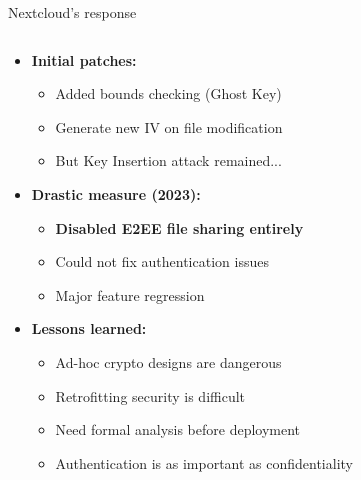\documentclass[aspectratio=169, lualatex, handout]{beamer}
\begin{document}
\begin{frame}{Nextcloud's response}
	\begin{columns}[c]
		\begin{column}{1\textwidth}
			\begin{itemize}
				\item \textbf{Initial patches:}
				      \begin{itemize}
					      \item Added bounds checking (Ghost Key)
					      \item Generate new IV on file modification
					      \item But Key Insertion attack remained...
				      \end{itemize}
				\item \textbf{Drastic measure (2023):}
				      \begin{itemize}
					      \item \textbf{Disabled E2EE file sharing entirely}
					      \item Could not fix authentication issues
					      \item Major feature regression
				      \end{itemize}
				\item \textbf{Lessons learned:}
				      \begin{itemize}
					      \item Ad-hoc crypto designs are dangerous
					      \item Retrofitting security is difficult
					      \item Need formal analysis before deployment
					      \item Authentication is as important as confidentiality
				      \end{itemize}
			\end{itemize}
		\end{column}
	\end{columns}
\end{frame}
\end{document}
